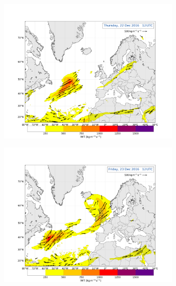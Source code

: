 \begin{figure}[H]
	\begin{subfigure}[b]{0.49\textwidth}
		\includegraphics[trim={4.2cm 3.9cm 4.3cm 5.1cm},clip,
		width=\textwidth]{./fig_Atm_Riv/20161222_12}
		\caption{}\label{fig:AR22}
	\end{subfigure}
	\begin{subfigure}[b]{0.49\textwidth}
		\includegraphics[trim={4.2cm 3.9cm 4.3cm 5.1cm},clip,
		width=\textwidth]{./fig_Atm_Riv/20161223_12}
		\caption{}\label{fig:AR23}
	\end{subfigure}
	\begin{subfigure}[b]{\textwidth}

\end{subfigure}
\end{figure}
